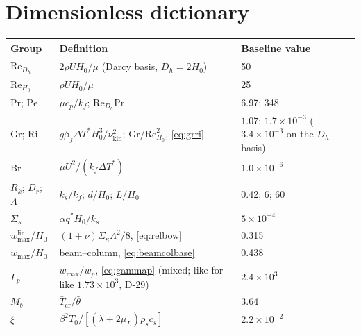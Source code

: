 \section{Dimensionless dictionary}
\begin{center}
\begin{tabular}{lll}
\toprule
Group & Definition & Baseline value \\
\midrule
$\mathrm{Re}_{D_h}$ & $2\rho UH_0/\mu$ (Darcy basis, $D_h=2H_0$) & 50 \\
$\mathrm{Re}_{H_0}$ & $\rho UH_0/\mu$ & 25 \\
$\mathrm{Pr}$; $\mathrm{Pe}$ & $\mu c_p/k_f$; $\mathrm{Re}_{D_h}\mathrm{Pr}$ & 6.97; 348 \\
$\mathrm{Gr}$; $\mathrm{Ri}$ & $g\beta_f\Delta T^*H_0^3/\nu_{\mathrm{kin}}^2$; $\mathrm{Gr}/\mathrm{Re}_{H_0}^2$, \eqref{eq:grri} & $1.07$; $1.7\times10^{-3}$ ($3.4\times10^{-3}$ on the $D_h$ basis) \\
$\mathrm{Br}$ & $\mu U^2/(k_f\Delta T^*)$ & $1.0\times10^{-6}$ \\
$R_k$; $D_r$; $\Lambda$ & $k_s/k_f$; $d/H_0$; $L/H_0$ & 0.42; 6; 60 \\
$\Sigma_\kappa$ & $\alpha q^{''}H_0/k_s$ & $5\times10^{-4}$ \\
$w_{\max}^{\mathrm{lin}}/H_0$ & $(1+\nu)\Sigma_\kappa\Lambda^2/8$, \eqref{eq:relbow} & 0.315 \\
$w_{\max}/H_0$ & beam--column, \eqref{eq:beamcolbase} & 0.438 \\
$\Gamma_p$ & $w_{\max}/w_p$, \eqref{eq:gammap} (mixed; like-for-like $1.73\times10^3$, D-29) & $2.4\times10^3$ \\
$M_b$ & $\bar T_{\mathrm{cr}}/\bar\theta$ & 3.64 \\
$\xi$ & $\beta^2T_0/[(\lambda+2\mu_L)\rho_sc_s]$ & $2.2\times10^{-2}$ \\
\bottomrule
\end{tabular}
\end{center}

